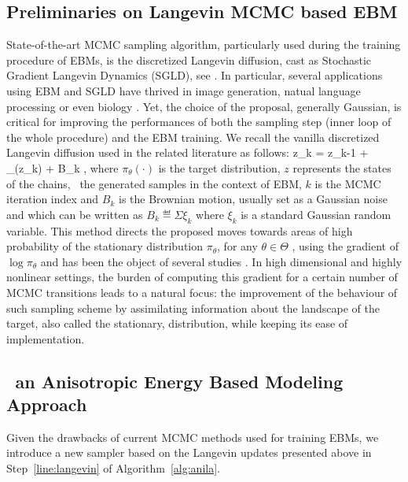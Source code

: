 \documentclass[10pt,twocolumn,letterpaper]{article}
\begin{document}
\subsection{Preliminaries on Langevin MCMC based EBM}
State-of-the-art MCMC sampling algorithm, particularly used during the training procedure of EBMs, is the discretized Langevin diffusion, cast as Stochastic Gradient Langevin Dynamics (SGLD), see \cite{welling2011bayesian}.
In particular, several applications using EBM and SGLD have thrived in image generation, natual language processing or even biology \cite{du2020energy}.
Yet, the choice of the proposal, generally Gaussian, is critical for improving the performances of both the sampling step (inner loop of the whole procedure) and the EBM training.
We recall the vanilla discretized Langevin diffusion used in the related literature as follows:
\beq\notag
z_k = z_{k-1} +  \nabla \log \pi_\theta(z_k) + \sqrt{\gamma} B_k \eqsp,
\eeq
where $\pi_\theta(\cdot)$ is the target distribution, $z$ represents the states of the chains, \ie\ the generated samples in the context of EBM, $k$ is the MCMC iteration index and $B_k$ is the Brownian motion, usually set as a Gaussian noise and which can be written as $B_k \eqdef \Sigma \xi_k$ where $\xi_k$ is a standard Gaussian random variable.
This method directs the proposed moves towards areas of high probability of the stationary distribution $\pi_\theta$, for any $\theta \in \Theta$ , using the gradient of $\log \pi_{\theta}$ and has been the object of several studies \cite{girolami,cotter2013mcmc}.
In high dimensional and highly nonlinear settings, the burden of computing this gradient for a certain number of MCMC transitions leads to a natural focus: the improvement of the behaviour of such sampling scheme by assimilating information about the landscape of the target, also called the stationary, distribution, while keeping its ease of implementation.

\subsection{\algo\, an Anisotropic Energy Based Modeling Approach}

Given the drawbacks of current MCMC methods used for training EBMs, we introduce a new sampler based on the Langevin updates presented above in Step~\ref{line:langevin} of Algorithm~\ref{alg:anila}.
\end{document}
